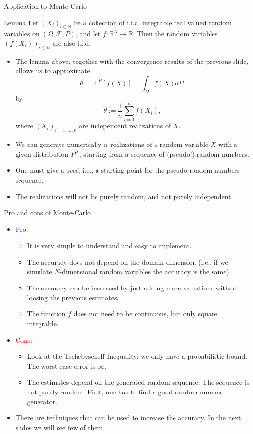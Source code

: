 \documentclass[9 pt]{beamer} %
\def \blue {\textcolor{blue}}
\def \red {\textcolor{red}}
\def \F {\mathcal{F}}
\def \bE {\mathbb{E}}
\begin{document}
\begin{frame}{Application to Monte-Carlo}
\begin{block}{Lemma} 
Let $(X_i)_{i \in \mathbb{N}}$ be a collection of i.i.d. integrable real valued random variables on  $(\Omega, \F, P)$, and let $f : \mathbb{R}^N \to \mathbb{R}$. Then the random variables $(f(X_i))_{i \in \mathbb{N}}$ are also i.i.d.
\end{block}
\begin{itemize}
\item The lemma above, together with the convergence results of the previous slide, allows us to approximate
 $$
\theta := \bE^P[f(X)] = \int_{\Omega}f(X)dP.
$$
by 
 $$
\hat \theta := \frac{1}{n} \sum_{i=1}^n f(X_i),
$$
where  $(X_i)_{i = 1, \dots, n}$ are independent realizations of $X$.
\item We can generate numerically $n$ realizations of a random variable $X$ with a given distribution $P^X$, starting from a sequence of (pseudo!) random numbers. 
\item One must give a \emph{seed}, i.e., a starting point for the pseudo-random numbers sequence.
\item The realizations will not be purely random, and not purely independent.
\end{itemize}
\end{frame} 

\begin{frame}{Pro and cons of Monte-Carlo}
\begin{itemize}
\item \blue{Pro:}
\begin{itemize}
\item It is very simple to understand and easy to implement.
\item The accuracy does not depend on the domain dimension (i.e., if we simulate $N$-dimensional  random variables the accuracy is the same).
\item The accuracy can be increased by just adding more valuations without loosing the previous estimates.
\item The function $f$ does not need to be continuous, but only square integrable.
\end{itemize}
\item \red{Cons:}
\begin{itemize}
\item Look at the Tschebyscheff Inequality: we only have a probabilistic bound. The worst case error is $\infty$.
\item The estimates depend on the generated random sequence. The sequence is not purely random. First, one has to find a good random number generator.
\end{itemize}
\item There are techniques that can be used to increase the accuracy. In the next slides we will see few of them.
\end{itemize}
\end{frame} 
\end{document}

